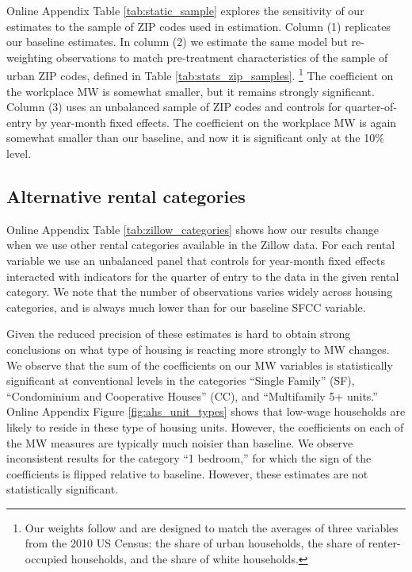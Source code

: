 Online Appendix Table \ref{tab:static_sample} explores the sensitivity of our 
estimates to the sample of ZIP codes used in estimation.
Column (1) replicates our baseline estimates.
In column (2) we estimate the same model but re-weighting observations 
to match pre-treatment characteristics of the sample of urban ZIP codes,
defined in Table \ref{tab:stats_zip_samples}.%
\footnote{Our weights follow \textcite{Hainmueller2012} and are designed to 
    match the averages of three variables from the 2010 US Census:
    the share of urban households,
    the share of renter-occupied households, and
    the share of white households.}
The coefficient on the workplace MW is somewhat smaller, but it remains 
strongly significant.
Column (3) uses an unbalanced sample of ZIP codes and controls for 
quarter-of-entry by year-month fixed effects.
The coefficient on the workplace MW is again somewhat smaller than our baseline,
and now it is significant only at the 10\% level.


\subsection{Alternative rental categories}
\label{sec:alternative_categories}

Online Appendix Table \ref{tab:zillow_categories} shows how our results change 
when we use other rental categories available in the Zillow data.
For each rental variable we use an unbalanced panel that controls for
year-month fixed effects interacted with indicators for the quarter of entry
to the data in the given rental category.
We note that the number of observations varies widely across housing categories, 
and is always much lower than for our baseline SFCC variable.

Given the reduced precision of these estimates is hard to obtain strong 
conclusions on what type of housing is reacting more strongly to MW changes.
We observe that the sum of the coefficients on our MW variables is 
statistically significant at conventional levels in the categories 
``Single Family'' (SF),  ``Condominium and Cooperative Houses'' (CC), and 
``Multifamily 5+ units.''
Online Appendix Figure \ref{fig:ahs_unit_types} shows that low-wage households 
are likely to reside in these type of housing units.
However, the coefficients on each of the MW measures are typically much noisier 
than baseline.
We observe inconsistent results for the category ``1 bedroom,'' for which the 
sign of the coefficients is flipped relative to baseline.
However, these estimates are not statistically significant.

